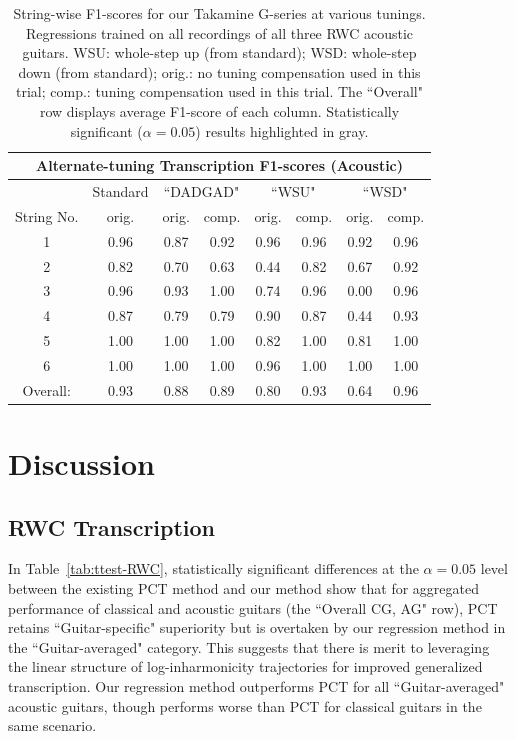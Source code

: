 \documentclass[convention,peer-reviewed]{aesconf}
\begin{document}
\begin{table}[!htbp]
\begin{center}
\begin{tabular}{||c||c||c|c||c|c||c|c||}
\hline
\multicolumn{8}{|c|}{\bf{Alternate-tuning Transcription F1-scores (Acoustic)}} \\
\hline
& Standard & \multicolumn{2}{|c|}{``DADGAD"} & \multicolumn{2}{|c|}{``WSU"} & \multicolumn{2}{|c|}{``WSD"} \\
\hline
String No. & orig. & orig. & comp. & orig. & comp. & orig. & comp. \\
\hline
1 & 0.96 & 0.87 & 0.92 & 0.96 & 0.96 & 0.92 & 0.96 \\
\hline
2 & 0.82 & 0.70 & 0.63 & 0.44 & 0.82 & 0.67 & 0.92\\
\hline
3 & 0.96 & 0.93 & 1.00 & 0.74 & 0.96 & 0.00 & 0.96\\
\hline
4 & 0.87 & 0.79 & 0.79 & 0.90 & 0.87 & 0.44 & 0.93 \\
\hline
5 & 1.00 & 1.00 & 1.00 & 0.82 & 1.00 & 0.81 & 1.00 \\
\hline
6 & 1.00 & 1.00 & 1.00 & 0.96 & 1.00 & 1.00 & 1.00\\ 
\hline
\hline
Overall: & 0.93 & 0.88 & 0.89 & \cellcolor[gray]{0.8}0.80 & \cellcolor[gray]{0.8}0.93 & \cellcolor[gray]{0.8}0.64 & \cellcolor[gray]{0.8}0.96\\
\hline
\end{tabular}
\caption{String-wise F1-scores for our Takamine G-series at various tunings. Regressions trained on all recordings of all three RWC acoustic guitars. WSU: whole-step up (from standard); WSD: whole-step down (from standard); orig.: no tuning compensation used in this trial; comp.: tuning compensation used in this trial. The ``Overall" row displays average F1-score of each column. Statistically significant ($\alpha=0.05$) results highlighted in gray.} 
\label{tab:results-ag-tune}
\end{center}
\end{table}


\section{Discussion} 
\subsection{RWC Transcription}
In Table~\ref{tab:ttest-RWC}, statistically significant differences at the $\alpha = 0.05$ level between the existing PCT method and our method show that for aggregated performance of classical and acoustic guitars (the ``Overall CG, AG" row), PCT retains ``Guitar-specific" superiority but is overtaken by our regression method in the ``Guitar-averaged" category. This suggests that there is merit to leveraging the linear structure of log-inharmonicity trajectories for improved generalized transcription. Our regression method outperforms PCT for all ``Guitar-averaged" acoustic guitars, though performs worse than PCT for classical guitars in the same scenario.
\end{document}
